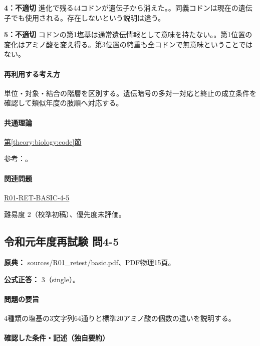 \noindent\textbf{4：不適切} 進化で残る44コドンが遺伝子から消えた。。同義コドンは現在の遺伝子でも使用される。存在しないという説明は違う。\par

\noindent\textbf{5：不適切} コドンの第1塩基は通常遺伝情報として意味を持たない。。第1位置の変化はアミノ酸を変え得る。第3位置の縮重も全コドンで無意味ということではない。\par

\paragraph{再利用する考え方} 単位・対象・結合の階層を区別する。遺伝暗号の多対一対応と終止の成立条件を確認して類似年度の肢順へ対応する。

\paragraph{共通理論} \hyperref[theory:biology:code]{第\ref*{theory:biology:code}節}

\par 参考：\cite{nhgri_codon}。

\paragraph{関連問題} \hyperref[q:r01-ret-basic-4-5]{R01-RET-BASIC-4-5}

\par 難易度 2（校準初稿）、優先度未評価。

\subsection{令和元年度再試験 問4-5}
\label{q:r01-ret-basic-4-5}

\noindent\textbf{原典：} sources/R01\_retest/basic.pdf、PDF物理15頁。

\textbf{公式正答：} 3（single）。

\paragraph{問題の要旨} 4種類の塩基の3文字列64通りと標準20アミノ酸の個数の違いを説明する。

\paragraph{確認した条件・記述（独自要約）}\mbox{}\par

